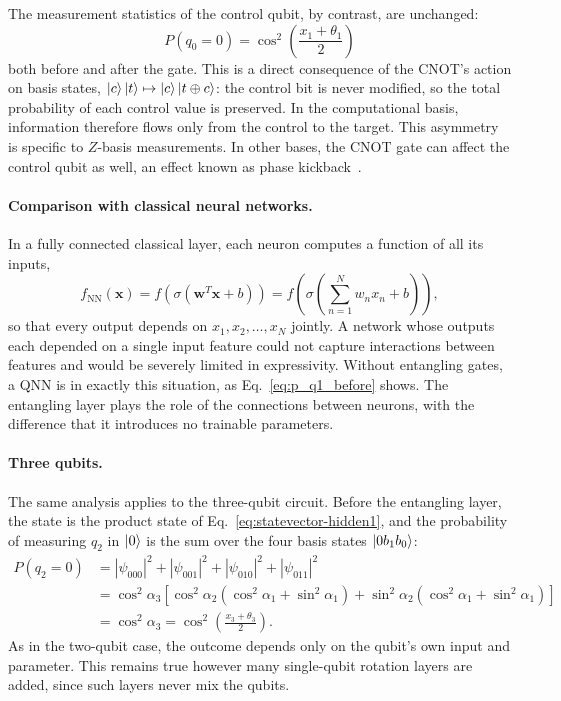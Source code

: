 \documentclass[12pt]{article}
\numberwithin{equation}{section}  %
\begin{document}
The measurement statistics of the control qubit, by contrast, are unchanged:
\begin{equation}
P(q_0 = 0) = \cos^2\!\left(\frac{x_1 + \theta_1}{2}\right)
\end{equation}
both before and after the gate. This is a direct consequence of the CNOT's action on basis states, $\ket{c}\ket{t} \mapsto \ket{c}\ket{t \oplus c}$: the control bit is never modified, so the total probability of each control value is preserved. In the computational basis, information therefore flows only from the control to the target. This asymmetry is specific to $Z$-basis measurements. In other bases, the CNOT gate can affect the control qubit as well, an effect known as phase kickback~\cite{nielsen2010quantum}.

\paragraph{Comparison with classical neural networks.} In a fully connected classical layer, each neuron computes a function of all its inputs,
\begin{equation}
f_{\mathrm{NN}}(\mathbf{x}) = f\!\left(\sigma\!\left(\mathbf{w}^{T}\mathbf{x} + b\right)\right)
= f\!\left(\sigma\!\left(\sum_{n=1}^{N} w_n x_n + b\right)\right),
\label{eq:nnfunc}
\end{equation}
so that every output depends on $x_1, x_2, \ldots, x_N$ jointly. A network whose outputs each depended on a single input feature could not capture interactions between features and would be severely limited in expressivity. Without entangling gates, a QNN is in exactly this situation, as Eq.~\eqref{eq:p_q1_before} shows. The entangling layer plays the role of the connections between neurons, with the difference that it introduces no trainable parameters.

\paragraph{Three qubits.} The same analysis applies to the three-qubit circuit. Before the entangling layer, the state is the product state of Eq.~\eqref{eq:statevector-hidden1}, and the probability of measuring $q_2$ in $\ket{0}$ is the sum over the four basis states $\ket{0b_1b_0}$:
\begin{equation}
\begin{aligned}
P(q_2 = 0) &= |\psi_{000}|^2 + |\psi_{001}|^2 + |\psi_{010}|^2 + |\psi_{011}|^2 \\
&= \cos^2\alpha_3 \left[\cos^2\alpha_2\left(\cos^2\alpha_1 + \sin^2\alpha_1\right) + \sin^2\alpha_2\left(\cos^2\alpha_1 + \sin^2\alpha_1\right)\right] \\
&= \cos^2\alpha_3 = \cos^2\!\left(\frac{x_3 + \theta_3}{2}\right).
\end{aligned}
\label{eq:p_q2_before}
\end{equation}
As in the two-qubit case, the outcome depends only on the qubit's own input and parameter. This remains true however many single-qubit rotation layers are added, since such layers never mix the qubits.
\end{document}
